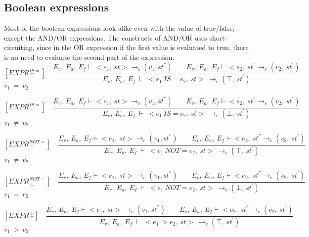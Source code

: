    	\subsection{Boolean expressions}
   	Most of the boolean expressions look alike even with the value of true/false, except the AND/OR expressions. The constructs of AND/OR uses short-circuiting, since in the OR expression if the first value is evaluated to true, there is no need to evaluate the second part of the expression.
   	\[
   	[EXPR^{IS=}_{\ \top}] \quad
   	\dfrac{E_v, \ E_a, \ E_f \vdash <e_1, \ st> \rightarrow_e (v_1, st^{''}) \qquad E_v, \ E_a, \ E_f \vdash <e_2, \ st^{''} \rightarrow_e (v_2, \ st^{'})}{E_v, \ E_a, \ E_f \ \vdash \ <e_1
   	\ IS= e_2, \ st> \ \rightarrow_e (\top, \ st^{'})}
   	\]
   	\begin{math}
   	v_1 \ = \ v_2 
   	\end{math}

   	\[
   	[EXPR^{IS=}_{\ \bot}] \quad
   	\dfrac{E_v, \ E_a, \ E_f \vdash <e_1, \ st> \rightarrow_e (v_1, st^{''}) \qquad E_v, \ E_a, \ E_f \vdash <e_2, \ st^{''} \rightarrow_e (v_2, \ st^{'})}{E_v, \ E_a, \ E_f \ \vdash \ <e_1
   	\ IS= e_2, \ st> \ \rightarrow_e (\bot, \ st^{'})}
   	\]
	\begin{math}
   	v_1 \ \not= \ v_2
   	\end{math}


   	\[
   	[EXPR^{NOT=}_{\ \top}] \quad
   	\dfrac{E_v, \ E_a, \ E_f \vdash <e_1, \ st> \rightarrow_e (v_1, st^{''}) \qquad E_v, \ E_a, \ E_f \vdash <e_2, \ st^{''} \rightarrow_e (v_2, \ st^{'})}{E_v, \ E_a, \ E_f \ \vdash \ <e_1 \ NOT= e_2, \ st> \ \rightarrow_e (\top, \ st^{'})}
   	\]
	\begin{math}
   	v_1 \ \not= \ v_2
   	\end{math}   	
   	

   	\[
   	[EXPR^{NOT=}_{\ \bot}] \quad
   	\dfrac{E_v, \ E_a, \ E_f \vdash <e_1, \ st> \rightarrow_e (v_1, st^{''}) \qquad E_v, \ E_a, \ E_f \vdash <e_2, \ st^{''} \rightarrow_e (v_2, \ st^{'})}{E_v, \ E_a, \ E_f \ \vdash \ <e_1 \ NOT= e_2, \ st> \ \rightarrow_e (\bot, \ st^{'})}
   	\]
	\begin{math}
   	v_1 \ = \ v_2
   	\end{math}   	
   	
   	
   	\[
   	[EXPR^{\ >}_{\ \top}] \quad
   	\dfrac{E_v, \ E_a, \ E_f \vdash <e_1, \ st> \rightarrow_e (v_1, st^{''}) \qquad E_v, \ E_a, \ E_f \vdash <e_2, \ st^{''} \rightarrow_e (v_2, \ st^{'})}{E_v, \ E_a, \ E_f \ \vdash \ <e_1 \ > e_2, \ st> \ \rightarrow_e (\top, \ st^{'})}
   	\]
	\begin{math}
   	v_1 \ > \ v_2
   	\end{math}   	
   	

